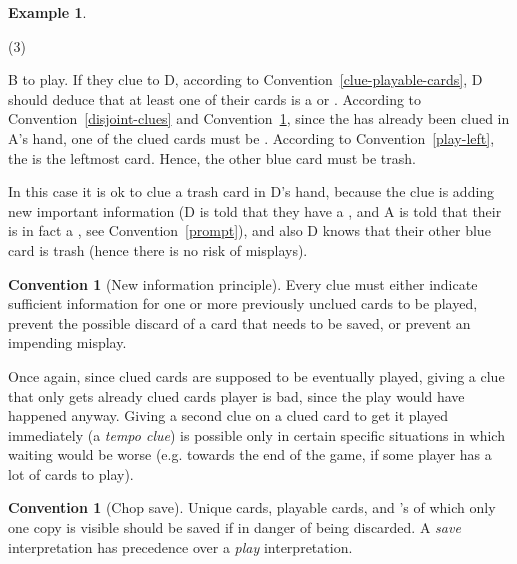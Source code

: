 \documentclass[a4paper]{article}
\theoremstyle{plain}
\theoremstyle{definition}
\newtheorem{example}[theorem]{Example}
\newtheorem{convention}[theorem]{Convention}
\begin{document}
\begin{example}
	\hfill
	\begin{tasks}(3)
		\task[+]      
		\task[A]    
		\task[B]    
		\task[C]    
		\task[D]    
		\task[E]    
	\end{tasks}

	B to play. If they clue  to D, according to Convention~\ref{clue-playable-cards}, D should deduce that at least one of their cards is a  or . According to Convention~\ref{disjoint-clues} and Convention~\ref{new-information}, since the  has already been clued in A's hand, one of the clued cards must be . According to Convention~\ref{play-left}, the  is the leftmost card. Hence, the other blue card must be trash.
	
	In this case it is ok to clue a trash card in D's hand, because the clue is adding new important information (D is told that they have a , and A is told that their  is in fact a , see Convention~\ref{prompt}), and also D knows that their other blue card is trash (hence there is no risk of misplays).
\end{example}

\begin{convention}[New information principle]
	\label{new-information}
	Every clue must either indicate sufficient information for one or more previously unclued cards to be played, prevent the possible discard of a card that needs to be saved, or prevent an impending misplay.
\end{convention}

Once again, since clued cards are supposed to be eventually played, giving a clue that only gets already clued cards player is bad, since the play would have happened anyway. Giving a second clue on a clued card to get it played immediately (a \textit{tempo clue}) is possible only in certain specific situations in which waiting would be worse (e.g. towards the end of the game, if some player has a lot of cards to play).

\begin{convention}[Chop save]
	Unique cards, playable cards, and 's of which only one copy is visible should be saved if in danger of being discarded. A \textit{save} interpretation has precedence over a \textit{play} interpretation.
\end{convention}
\end{document}
